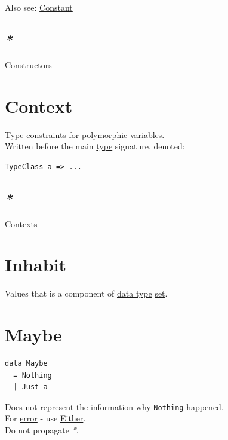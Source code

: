 \documentclass[a4paper,14pt,oneside]{book}
\begin{document}
Also see: \hyperref[org67a12c4]{Constant}\\

\subsection{\emph{*}}
\label{sec:org98567d7}

\label{orga90a903}Constructors\\

\section{\label{orgbfccf2e}Context}
\label{sec:org74bf9e2}
\hyperref[orgb064f4e]{Type} \hyperref[org8e2ef8b]{constraints} for \hyperref[org79790a1]{polymorphic} \hyperref[org03ce465]{variables}.\\
Written before the main \hyperref[orgb064f4e]{type} signature, denoted:\\
\begin{verbatim}
TypeClass a => ...
\end{verbatim}

\subsection{\emph{*}}
\label{sec:orga1eb94c}

\label{org7cd4d20}Contexts\\

\section{\label{orgb1da41a}Inhabit}
\label{sec:org944c4d3}
Values that is a component of \hyperref[org5a3f461]{data type} \hyperref[org74bf657]{set}.\\

\section{\label{org04b0db9}Maybe}
\label{sec:org8200806}
\begin{verbatim}
data Maybe
  = Nothing
  | Just a
\end{verbatim}

Does not represent the information why \texttt{Nothing} happened.\\
For \hyperref[org11ebac1]{error} - use \hyperref[org7798322]{Either}.\\
Do not propagate \emph{*}.\\
\end{document}
